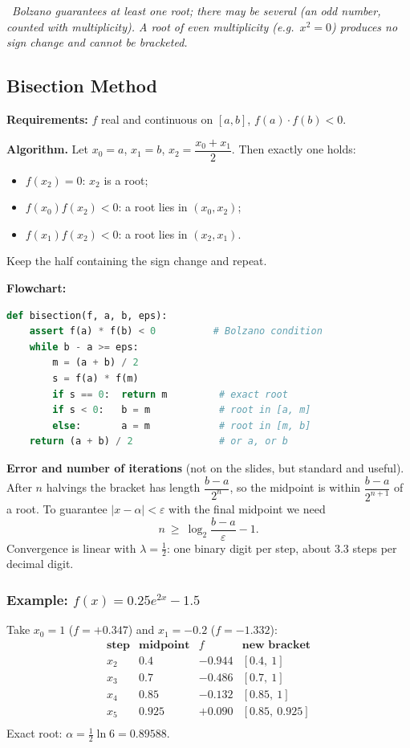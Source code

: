 \documentclass[hidelinks]{article}
\newcommand{\callout}[1]{\par\smallskip\noindent{\color{capri}$\blacktriangleright$}\ \textit{#1}\par\smallskip}
\newcommand{\abs}[1]{\left|#1\right|}
\begin{document}
\callout{Bolzano guarantees \emph{at least one} root; there may be several (an odd number, counted with multiplicity). A root of even multiplicity (e.g.\ $x^2=0$) produces no sign change and cannot be bracketed.}

\subsection{Bisection Method}

\textbf{Requirements:} $f$ real and continuous on $[a,b]$, $f(a)\cdot f(b)<0$.

\textbf{Algorithm.} Let $x_0=a$, $x_1=b$, $x_2=\dfrac{x_0+x_1}{2}$. Then exactly one holds:
\begin{itemize}
    \item $f(x_2)=0$: $x_2$ is a root;
    \item $f(x_0)f(x_2)<0$: a root lies in $(x_0,x_2)$;
    \item $f(x_1)f(x_2)<0$: a root lies in $(x_2,x_1)$.
\end{itemize}
Keep the half containing the sign change and repeat.

\textbf{Flowchart:}
\begin{lstlisting}[language=Python]
def bisection(f, a, b, eps):
    assert f(a) * f(b) < 0          # Bolzano condition
    while b - a >= eps:
        m = (a + b) / 2
        s = f(a) * f(m)
        if s == 0:  return m         # exact root
        if s < 0:   b = m            # root in [a, m]
        else:       a = m            # root in [m, b]
    return (a + b) / 2               # or a, or b
\end{lstlisting}

\textbf{Error and number of iterations} (not on the slides, but standard and useful). After $n$ halvings the bracket has length $\dfrac{b-a}{2^n}$, so the midpoint is within $\dfrac{b-a}{2^{n+1}}$ of a root. To guarantee $\abs{x-\alpha}<\varepsilon$ with the final midpoint we need
\[
n\ \ge\ \log_2\frac{b-a}{\varepsilon}-1 .
\]
Convergence is linear with $\lambda=\tfrac12$: one binary digit per step, about $3.3$ steps per decimal digit.

\subsubsection{Example: $f(x)=0.25e^{2x}-1.5$}

Take $x_0=1$ ($f=+0.347$) and $x_1=-0.2$ ($f=-1.332$):
\[
\begin{array}{cccc}
\textbf{step} & \textbf{midpoint} & f & \textbf{new bracket}\\ \hline
x_2 & 0.4 & -0.944 & [0.4,\ 1]\\
x_3 & 0.7 & -0.486 & [0.7,\ 1]\\
x_4 & 0.85 & -0.132 & [0.85,\ 1]\\
x_5 & 0.925 & +0.090 & [0.85,\ 0.925]\\
\end{array}
\]
Exact root: $\alpha=\tfrac12\ln6=0.89588$.
\end{document}

